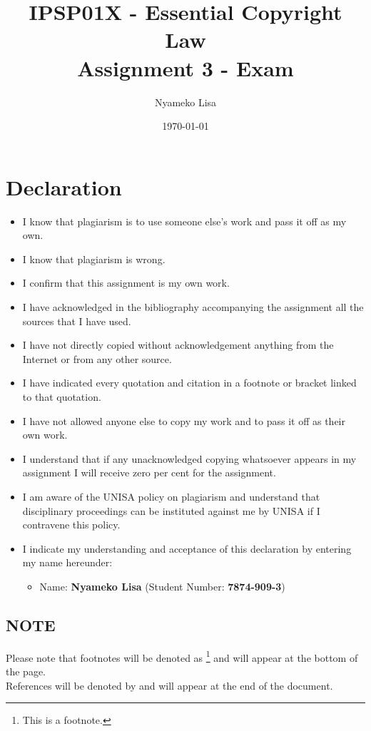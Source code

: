 \documentclass[11pt]{article}
\author{Nyameko Lisa}
\date{\today}
\title{IPSP01X - Essential Copyright Law\\\medskip
\large Assignment 3 - Exam}
\begin{document}
\maketitle
\section*{Declaration}
\label{sec:orgc976d7a}
\begin{itemize}
\item I know that plagiarism is to use someone else’s work and pass it off as my own.
\item I know that plagiarism is wrong.
\item I confirm that this assignment is my own work.
\item I have acknowledged in the bibliography accompanying the assignment all the sources that I have used.
\item I have not directly copied without acknowledgement anything from the Internet or from any other source.
\item I have indicated every quotation and citation in a footnote or bracket linked to that quotation.
\item I have not allowed anyone else to copy my work and to pass it off as their own work.
\item I understand that if any unacknowledged copying whatsoever appears in my assignment I will receive zero per cent for the assignment.
\item I am aware of the UNISA policy on plagiarism and understand that disciplinary proceedings can be instituted against me by UNISA if I contravene this policy.
\item I indicate my understanding and acceptance of this declaration by
entering my name hereunder:
\begin{itemize}
\item Name: \textbf{Nyameko Lisa} (Student Number: \textbf{7874-909-3})
\end{itemize}
\end{itemize}

\subsection*{NOTE}
\label{sec:orgbbfa2d2}
Please note that footnotes will be denoted as \footnote{This is a footnote.} and will
appear at the bottom of the page.\\
References will be denoted by \cite{rsa78_copyrightact} and will appear at the end of the document.
\newpage
\end{document}
